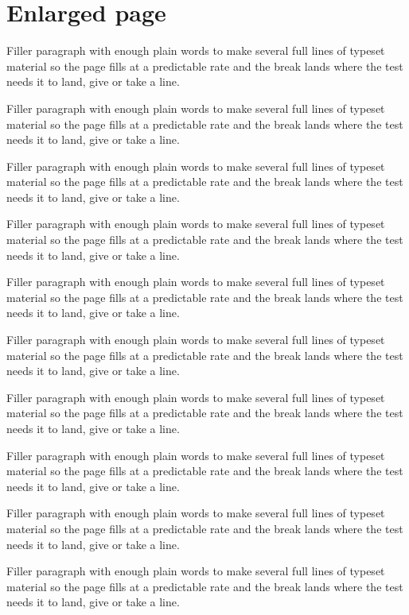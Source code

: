 \documentclass[11pt,a4paper]{article}
\begin{document}
\section{Enlarged page}

Filler paragraph with enough plain words to make several full lines of typeset material so the page fills at a predictable rate and the break lands where the test needs it to land, give or take a line.

Filler paragraph with enough plain words to make several full lines of typeset material so the page fills at a predictable rate and the break lands where the test needs it to land, give or take a line.

Filler paragraph with enough plain words to make several full lines of typeset material so the page fills at a predictable rate and the break lands where the test needs it to land, give or take a line.

Filler paragraph with enough plain words to make several full lines of typeset material so the page fills at a predictable rate and the break lands where the test needs it to land, give or take a line.

Filler paragraph with enough plain words to make several full lines of typeset material so the page fills at a predictable rate and the break lands where the test needs it to land, give or take a line.

Filler paragraph with enough plain words to make several full lines of typeset material so the page fills at a predictable rate and the break lands where the test needs it to land, give or take a line.

Filler paragraph with enough plain words to make several full lines of typeset material so the page fills at a predictable rate and the break lands where the test needs it to land, give or take a line.

Filler paragraph with enough plain words to make several full lines of typeset material so the page fills at a predictable rate and the break lands where the test needs it to land, give or take a line.

Filler paragraph with enough plain words to make several full lines of typeset material so the page fills at a predictable rate and the break lands where the test needs it to land, give or take a line.

Filler paragraph with enough plain words to make several full lines of typeset material so the page fills at a predictable rate and the break lands where the test needs it to land, give or take a line.
\end{document}
